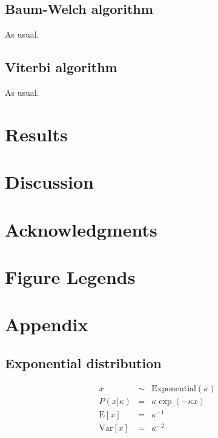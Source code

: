 \documentclass[10pt]{article}
\begin{document}
\subsection{Baum-Welch algorithm}

As usual.

\subsection{Viterbi algorithm}

As usual.


\newpage
\section{Results}




\section{Discussion}


\newpage
\section{Acknowledgments}



\clearpage
\section{Figure Legends}

\clearpage
\section{Appendix}

\subsection{Exponential distribution}

\begin{eqnarray*}
x & \sim & \mbox{Exponential}(\kappa) \\
P(x|\kappa) & = & \kappa \exp(-\kappa x) \\
\mbox{E}[x] & = & \kappa^{-1} \\
\mbox{Var}[x] & = & \kappa^{-2}
\end{eqnarray*}
\end{document}
